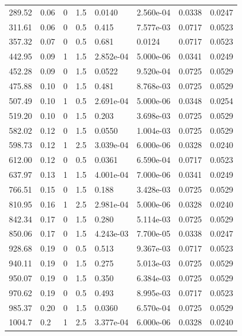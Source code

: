 \documentclass[preview]{standalone}
\begin{document}
{{\begin{tabular}{L{1.2cm}C{1.2cm} C{0.3cm}C{0.5cm} C{1.4cm}C{1.4cm} C{1.4cm}C{1.4cm}}
  289.52  &  0.06  & 0     & 1.5 &  0.0140  & 2.560e-04  & 0.0338 &  0.0247   \\ 
  311.61  &  0.06  & 0     & 0.5 &  0.415  & 7.577e-03  & 0.0717 &  0.0523   \\ 
  357.32  &  0.07  & 0     & 0.5 &  0.681  & 0.0124  & 0.0717 &  0.0523   \\ 
  442.95  &  0.09  & 1     & 1.5 &  2.852e-04  & 5.000e-06  & 0.0341 &  0.0249   \\ 
  452.28  &  0.09  & 0     & 1.5 &  0.0522  & 9.520e-04  & 0.0725 &  0.0529   \\ 
  475.88  &  0.10  & 0     & 1.5 &  0.481  & 8.768e-03  & 0.0725 &  0.0529   \\ 
  507.49  &  0.10  & 1     & 0.5 &  2.691e-04  & 5.000e-06  & 0.0348 &  0.0254   \\ 
  519.20  &  0.10  & 0     & 1.5 &  0.203  & 3.698e-03  & 0.0725 &  0.0529   \\ 
  582.02  &  0.12  & 0     & 1.5 &  0.0550  & 1.004e-03  & 0.0725 &  0.0529   \\ 
  598.73  &  0.12  & 1     & 2.5 &  3.039e-04  & 6.000e-06  & 0.0328 &  0.0240   \\ 
  612.00  &  0.12  & 0     & 0.5 &  0.0361  & 6.590e-04  & 0.0717 &  0.0523   \\ 
  637.97  &  0.13  & 1     & 1.5 &  4.001e-04  & 7.000e-06  & 0.0341 &  0.0249   \\ 
  766.51  &  0.15  & 0     & 1.5 &  0.188  & 3.428e-03  & 0.0725 &  0.0529   \\ 
  810.95  &  0.16  & 1     & 2.5 &  2.981e-04  & 5.000e-06  & 0.0328 &  0.0240   \\ 
  842.34  &  0.17  & 0     & 1.5 &  0.280  & 5.114e-03  & 0.0725 &  0.0529   \\ 
  850.06  &  0.17  & 0     & 1.5 &  4.243e-03  & 7.700e-05  & 0.0338 &  0.0247   \\ 
  928.68  &  0.19  & 0     & 0.5 &  0.513  & 9.367e-03  & 0.0717 &  0.0523   \\ 
  940.11  &  0.19  & 0     & 1.5 &  0.275  & 5.013e-03  & 0.0725 &  0.0529   \\ 
  950.07  &  0.19  & 0     & 1.5 &  0.350  & 6.384e-03  & 0.0725 &  0.0529   \\ 
  970.62  &  0.19  & 0     & 0.5 &  0.493  & 8.995e-03  & 0.0717 &  0.0523   \\ 
  985.37  &  0.20  & 0     & 1.5 &  0.0360  & 6.570e-04  & 0.0725 &  0.0529   \\ 
  1004.7  &   0.2  & 1     & 2.5 &  3.377e-04  & 6.000e-06  & 0.0328 &  0.0240   \\ 

\end{tabular}}}
\end{document}
